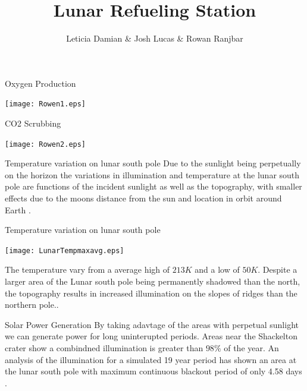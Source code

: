 \documentclass{beamer}
\title{ Lunar Refueling Station}
\author{Leticia Damian \& Josh Lucas \& Rowan Ranjbar }
\institute[CSUSM] %
{
  \inst{1}%
  Dept. of Physics\\
  California State University San Marcos
}
\date %
\begin{document}
 
\frame{\titlepage}

\begin{frame}{ Oxygen Production}


 \begin{center}
             \texttt{[image: Rowen1.eps]}   
      \end{center}  

\end{frame}

\begin{frame}{ CO2 Scrubbing}


 \begin{center}
             \texttt{[image: Rowen2.eps]}   
      \end{center}  

\end{frame}

\begin{frame}{Temperature variation on lunar south pole}
Due to the sunlight being perpetually on the horizon the variations in illumination and temperature at the lunar south pole are functions of the incident sunlight as well as the topography, with smaller effects due to the moons distance from the sun and location in orbit around Earth \cite{Williams}.
\end{frame}





\begin{frame}{Temperature variation on lunar south pole}
 \begin{center}
             \texttt{[image: LunarTempmaxavg.eps]}   
      \end{center}  
 The temperature vary from a average high of $213K $ and a low of $50K$.
 Despite a larger area of the Lunar south pole being permanently shadowed than the north, the topography results in increased illumination on the slopes of ridges than the northern pole.\cite{Williams}\cite{Hayne}.
\end{frame}




\begin{frame}{Solar Power Generation}
By taking adavtage of the areas with perpetual sunlight we can generate power for long uninterupted periods. Areas near the Shackelton crater show a combindned illumination is greater than $98 \% $ of the year\cite{Bussey}. An analysis of the illumination for a simulated 19 year period has shown an area at the lunar south pole with maximum continuous blackout period of only 4.58 days \cite{Mazarico}.  
\end{frame}
\end{document}
